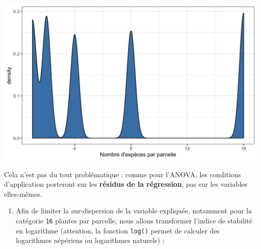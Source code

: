 \documentclass[a4paperpaper,]{article}
\newenvironment{Shaded}{\begin{snugshade}}{\end{snugshade}}
\newcommand{\DataTypeTok}[1]{\textcolor[rgb]{0.00,0.34,0.68}{#1}}
\newcommand{\FloatTok}[1]{\textcolor[rgb]{0.69,0.50,0.00}{#1}}
\newcommand{\KeywordTok}[1]{\textcolor[rgb]{0.12,0.11,0.11}{\textbf{#1}}}
\newcommand{\NormalTok}[1]{\textcolor[rgb]{0.12,0.11,0.11}{#1}}
\newcommand{\OperatorTok}[1]{\textcolor[rgb]{0.12,0.11,0.11}{#1}}
\newcommand{\StringTok}[1]{\textcolor[rgb]{0.75,0.01,0.01}{#1}}
\providecommand{\tightlist}{%
  \setlength{\itemsep}{0pt}\setlength{\parskip}{0pt}}
\begin{document}
\begin{Shaded}
\end{Shaded}

\begin{center}\includegraphics[width=0.9\linewidth]{figure/unnamed-chunk-114-1} \end{center}

Cela n'est pas du tout problématique : comme pour l'ANOVA, les conditions d'application porteront sur les \textbf{résidus de la régression}, pas sur les variables elles-mêmes.

\begin{enumerate}
\def\labelenumi{\arabic{enumi}.}
\setcounter{enumi}{1}
\tightlist
\item
  Afin de limiter la sur-dispersion de la variable expliquée, notamment pour la catégorie \texttt{16} plantes par parcelle, nous allons transformer l'indice de stabilité en logarithme (attention, la fonction \texttt{log()} permet de calculer des logarithmes népériens ou logarithmes naturels) :
\end{enumerate}

\begin{Shaded}
\end{Shaded}
\end{document}
